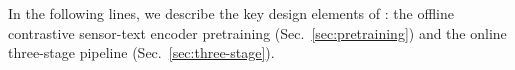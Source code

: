 
 








In the following lines, we describe the key design elements of \Method: the offline contrastive sensor-text encoder pretraining (Sec.~\ref{sec:pretraining}) and the online three-stage pipeline (Sec.~\ref{sec:three-stage}).






